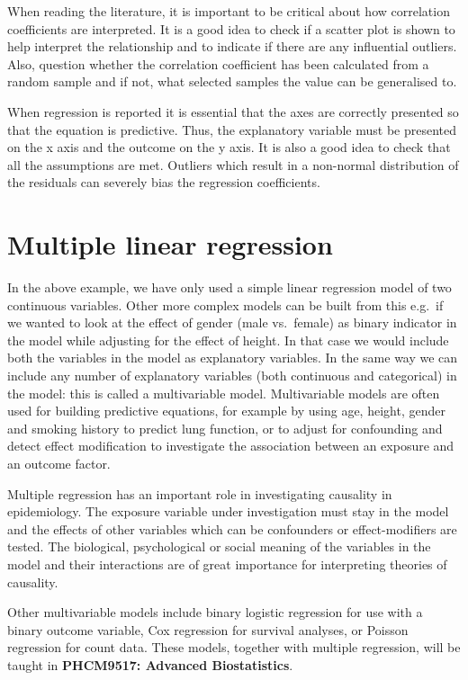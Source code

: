 \documentclass[
]{memoir}
\begin{document}
When reading the literature, it is important to be critical about how correlation coefficients are interpreted. It is a good idea to check if a scatter plot is shown to help interpret the relationship and to indicate if there are any influential outliers. Also, question whether the correlation coefficient has been calculated from a random sample and if not, what selected samples the value can be generalised to.

When regression is reported it is essential that the axes are correctly presented so that the equation is predictive. Thus, the explanatory variable must be presented on the x axis and the outcome on the y axis. It is also a good idea to check that all the assumptions are met. Outliers which result in a non-normal distribution of the residuals can severely bias the regression coefficients.

\hypertarget{multiple-linear-regression}{%
\section{Multiple linear regression}\label{multiple-linear-regression}}

In the above example, we have only used a simple linear regression model of two continuous variables. Other more complex models can be built from this e.g.~if we wanted to look at the effect of gender (male vs.~female) as binary indicator in the model while adjusting for the effect of height. In that case we would include both the variables in the model as explanatory variables. In the same way we can include any number of explanatory variables (both continuous and categorical) in the model: this is called a multivariable model. Multivariable models are often used for building predictive equations, for example by using age, height, gender and smoking history to predict lung function, or to adjust for confounding and detect effect modification to investigate the association between an exposure and an outcome factor.

Multiple regression has an important role in investigating causality in epidemiology. The exposure variable under investigation must stay in the model and the effects of other variables which can be confounders or effect-modifiers are tested. The biological, psychological or social meaning of the variables in the model and their interactions are of great importance for interpreting theories of causality.

Other multivariable models include binary logistic regression for use with a binary outcome variable, Cox regression for survival analyses, or Poisson regression for count data. These models, together with multiple regression, will be taught in \textbf{PHCM9517: Advanced Biostatistics}.
\end{document}
